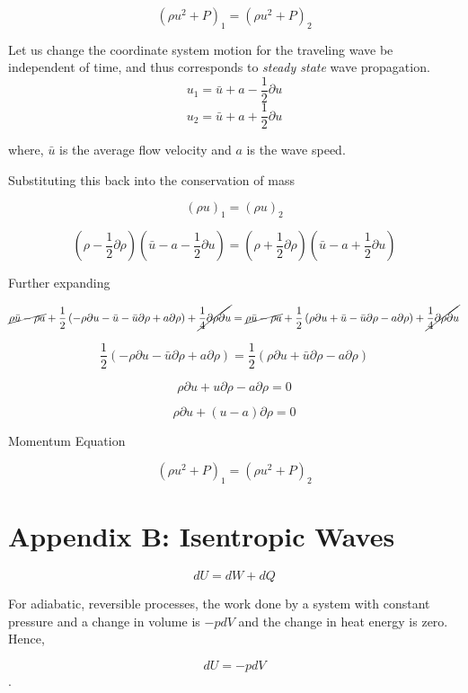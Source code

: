 \documentclass[12pt]{article}
\begin{document}
\[\left(\rho u^2 + P\right)_1 = \left(\rho u^2 + P\right)_2\]

Let us change the coordinate system motion for the traveling wave be independent of time, and thus corresponds to \textit{steady state} wave propagation. 
\[ u_1 = \bar{u} + a - \frac{1}{2} \partial u \]
\[ u_2 = \bar{u} + a + \frac{1}{2} \partial u \]


where, $\bar{u}$ is the average flow velocity and $a$ is the wave speed.


Substituting this back into the conservation of mass

\[\left(\rho u\right)_1 = \left(\rho u\right)_2 \]

\[ 
\left( \rho    - \frac{1}{2}\partial \rho \right) 
\left( \bar{u} - a - \frac{1}{2}\partial u\right) = 
\left( \rho    + \frac{1}{2}\partial \rho \right) 
\left( \bar{u} - a + \frac{1}{2}\partial u\right) 
\]

Further expanding

\[
\cancel{
	\rho \bar{u} - \rho a
} + 
\frac{1}{2} 
\left(
-\rho \partial u - \bar{u} - \bar{u} \partial \rho + a \partial \rho 
\right) +
\cancel{
	\frac{1}{4}\partial \rho \partial u 
}
= 
\cancel{
	\rho \bar{u} - \rho a
} + 
\frac{1}{2} 
\left(
\rho \partial u + \bar{u} - \bar{u} \partial \rho - a \partial \rho 
\right) +
\cancel{
	\frac{1}{4}\partial \rho \partial u 
}
\]
 
\[
  \frac{1}{2}\left( - \rho \partial u - \bar{u} \partial \rho + a \partial \rho\right) = 
  \frac{1}{2}\left(   \rho \partial u + \bar{u} \partial \rho - a \partial \rho\right)
\]

\[
\rho \partial u + u \partial \rho - a \partial \rho = 0 
\]

\[
\rho \partial u + \left( u - a\right)\partial \rho = 0
\]

Momentum Equation

\[
\left(\rho u^2 + P\right)_1 = 
\left(\rho u^2 + P\right)_2\]



\section{Appendix B: Isentropic Waves}

\[dU = dW + dQ\]

For adiabatic, reversible processes, the work done by a system with constant pressure and a change in volume is $-pdV$ and the change in heat energy is zero. Hence,

\[dU = -pdV\].
\end{document}
